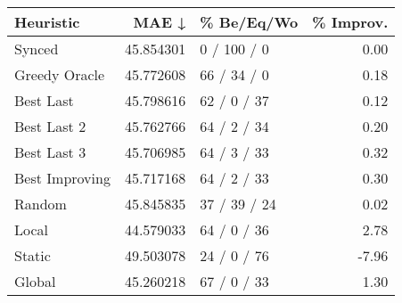 \begin{tabular}{lrlr}
\toprule
      Heuristic &      MAE ↓ &    \% Be/Eq/Wo & \% Improv. \\
\midrule
         Synced &  45.854301 &   0 / 100 / 0 &      0.00 \\
  Greedy Oracle &  45.772608 &   66 / 34 / 0 &      0.18 \\
      Best Last &  45.798616 &   62 / 0 / 37 &      0.12 \\
    Best Last 2 &  45.762766 &   64 / 2 / 34 &      0.20 \\
    Best Last 3 &  45.706985 &   64 / 3 / 33 &      0.32 \\
 Best Improving &  45.717168 &   64 / 2 / 33 &      0.30 \\
         Random &  45.845835 &  37 / 39 / 24 &      0.02 \\
          Local &  44.579033 &   64 / 0 / 36 &      2.78 \\
         Static &  49.503078 &   24 / 0 / 76 &     -7.96 \\
         Global &  45.260218 &   67 / 0 / 33 &      1.30 \\
\bottomrule
\end{tabular}

\label{tab:non_lr001_le1_bs2_Summary}
